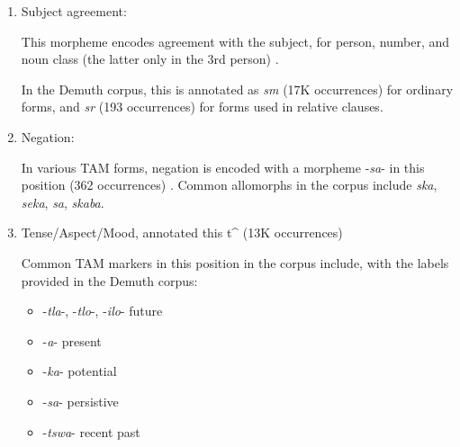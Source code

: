 \documentclass[11pt,letterpaper]{article}
\begin{document}
\begin{enumerate}
    \item Subject agreement: 
    
    This morpheme encodes agreement with the subject, for person, number, and noun class (the latter only in the 3rd person) \cite[]{doke1967textbook} \cite[p. 162]{guma1971outline}.
    
    In the Demuth corpus, this is annotated as \textit{sm} (17K occurrences) for ordinary forms, and \textit{sr} (193 occurrences) for forms used in relative clauses.

   
    
    \item Negation:
    
    In various TAM forms, negation is encoded with a morpheme -\textit{sa}- in this position (362 occurrences) \cite[p. 172]{guma1971outline} \cite[]{doke1967textbook}.
    Common allomorphs in the corpus include \textit{ska}, \textit{seka}, \textit{sa}, \textit{skaba}.
    
    
    
    \item Tense/Aspect/Mood, annotated this t\^{} (13K occurrences) \cite[p. 165]{guma1971outline}
    
    Common TAM markers in this position in the corpus include, with the labels provided in the Demuth corpus:
    
    \begin{itemize}
    \item -\textit{tla}-, -\textit{tlo}-, -\textit{ilo}- future \cite[--412]{doke1967textbook}
    \item -\textit{a}- present \cite[]{doke1967textbook}
    \item -\textit{ka}- potential \cite[--428]{doke1967textbook}
    \item -\textit{sa}- persistive \cite[--418]{doke1967textbook}
    \item -\textit{tswa}- recent past \cite[--406]{doke1967textbook} 
    
    
    \end{itemize}
    

\end{enumerate}
\end{document}
